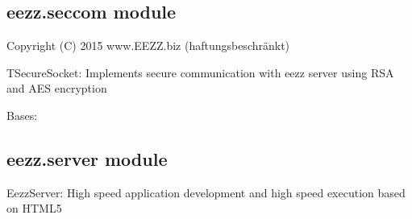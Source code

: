 \documentclass[letterpaper,10pt,english]{sphinxmanual}
\begin{document}
\subsection{eezz.seccom module}
\label{\detokenize{eezz:module-eezz.seccom}}\label{\detokenize{eezz:eezz-seccom-module}}
\sphinxAtStartPar
Copyright (C) 2015 www.EEZZ.biz (haftungsbeschränkt)

\sphinxAtStartPar
TSecureSocket:
Implements secure communication with eezz server
using RSA and AES encryption

\begin{savenotes}\begin{fulllineitems}
\label{\detokenize{eezz:eezz.seccom.TSecureSocket}}
\pysigstartsignatures
{}
\pysigstopsignatures
\sphinxAtStartPar
Bases: 

\begin{savenotes}\begin{fulllineitems}
\label{\detokenize{eezz:eezz.seccom.TSecureSocket.send_request}}
\pysigstartsignatures
{}
\pysigstopsignatures
\end{fulllineitems}\end{savenotes}


\end{fulllineitems}\end{savenotes}



\subsection{eezz.server module}
\label{\detokenize{eezz:module-eezz.server}}\label{\detokenize{eezz:eezz-server-module}}
\sphinxAtStartPar
EezzServer:
High speed application development and
high speed execution based on HTML5
\end{document}
